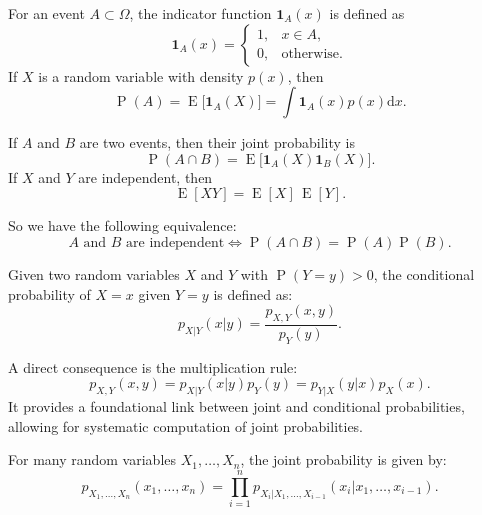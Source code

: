 \documentclass[11pt, headings=standardclasses, parskip=half, twoside]{scrartcl}
\newcommand{\dif}{\mathrm{d}}
\newcommand{\Exp}{\operatorname{E}}
\newcommand{\Prob}{\operatorname{P}}
\begin{document}

\begin{definition}\label{def:indicator}
For an event \(A\subset \Omega\), the indicator function \(\mathbf{1}_A(x)\) is defined as
\[
\mathbf{1}_A(x)=
\begin{cases}
1, & x\in A,\\[1mm]
0, & \text{otherwise}.
\end{cases}
\]
If \(X\) is a random variable with density \(p(x)\), then
\[
\Prob(A)=\Exp\bigl[\mathbf{1}_A(X)\bigr]=\int \mathbf{1}_A(x)p(x)\dif x.
\]
\end{definition}

If \(A\) and \(B\) are two events, then their joint probability is
\[
\Prob(A\cap B)=\Exp\bigl[\mathbf{1}_A(X)\mathbf{1}_B(X)\bigr].
\]
If \(X\) and \(Y\) are independent, then
\[
\Exp[XY]=\Exp[X]\,\Exp[Y].
\]

So we have the following equivalence:
\[
\text{$A$ and $B$ are independent} \iff \Prob(A\cap B)=\Prob(A)\Prob(B) \text{.}
\]

\begin{definition}\label{def:condprob}
Given two random variables \(X\) and \(Y\) with \(\Prob(Y=y)>0\), the conditional probability of \(X=x\) given \(Y=y\) is defined as:
\[
p_{X|Y}(x|y)=\frac{p_{X,Y}(x,y)}{p_Y(y)}.
\]
\end{definition}

A direct consequence is the multiplication rule:
\[
p_{X,Y}(x,y)=p_{X|Y}(x|y)p_Y(y)=p_{Y|X}(y|x)p_X(x).
\]
It provides a foundational link between joint and conditional probabilities, allowing for systematic computation of joint probabilities.

For many random variables \(X_1,\ldots,X_n\), the joint probability is given by:
\begin{equation}
\label{eq:joint_density_many}
p_{X_1,\ldots,X_n}(x_1,\ldots,x_n)=\prod_{i=1}^n p_{X_i|X_1,\ldots,X_{i-1}}(x_i|x_1,\ldots,x_{i-1}).
\end{equation}
\end{document}
